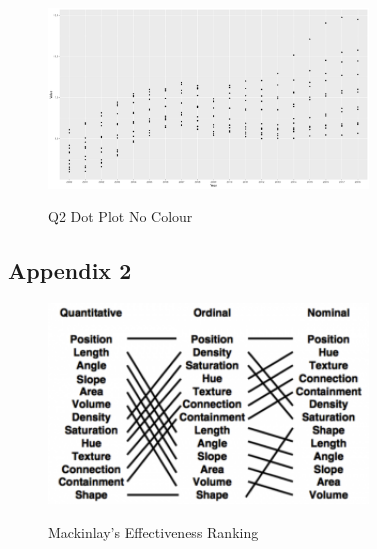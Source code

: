 \documentclass{article}
\begin{document}
\begin{figure}[H]
  \begin{minipage}[b]{1.0\linewidth}
    \centering
    \centerline{\includegraphics[width=8.5cm]{Q2Geom_point_no_colour}}
    \centerline{Q2 Dot Plot No Colour}\medskip
  \end{minipage}
\end{figure}

\subsection{Appendix 2}
\begin{figure}[H]
  \begin{minipage}[b]{1.0\linewidth}
    \centering
    \centerline{\includegraphics[width=8.5cm]{mackinlayRankings}}
    \centerline{Mackinlay's Effectiveness Ranking}\medskip
  \end{minipage}
\end{figure}
\end{document}
